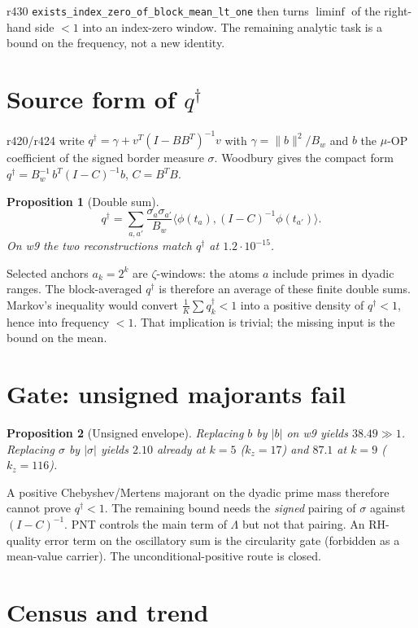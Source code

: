 \documentclass[11pt]{article}
\newtheorem{prop}{Proposition}
\theoremstyle{remark}
\newcommand{\qd}{q^{\dagger}}
\begin{document}
r430 \texttt{exists\_index\_zero\_of\_block\_mean\_lt\_one}
then turns $\liminf$ of the right-hand side $<1$ into an
index-zero window.  The remaining analytic task is a bound
on the frequency, not a new identity.

\section{Source form of $\qd$}\label{sec:src}

r420/r424 write
$\qd=\gamma+v^{T}(I-BB^{T})^{-1}v$ with
$\gamma=\lVert b\rVert^{2}/B_{w}$ and $b$ the $\mu$-OP
coefficient of the signed border measure $\sigma$.
Woodbury gives the compact form
$\qd=B_{w}^{-1}\,b^{T}(I-C)^{-1}b$, $C=B^{T}B$.

\begin{prop}[Double sum]\label{prop:src}
\[
\qd=\sum_{a,a'}\frac{\sigma_{a}\sigma_{a'}}{B_{w}}
\bigl\langle\phi(t_{a}),(I-C)^{-1}\phi(t_{a'})\bigr\rangle.
\]
On w9 the two reconstructions match $\qd$ at
$1.2\cdot 10^{-15}$.
\end{prop}

Selected anchors $a_{k}=2^{k}$ are $\zeta$-windows: the
atoms $a$ include primes in dyadic ranges.  The
block-averaged $\qd$ is therefore an average of these
finite double sums.  Markov's inequality would convert
$\frac1K\sum\qd_{k}<1$ into a positive density of
$\qd<1$, hence into frequency $<1$.  That implication is
trivial; the missing input is the bound on the mean.

\section{Gate: unsigned majorants fail}\label{sec:gate}

\begin{prop}[Unsigned envelope]\label{prop:unsigned}
Replacing $b$ by $|b|$ on w9 yields $38.49\gg 1$.
Replacing $\sigma$ by $|\sigma|$ yields $2.10$ already
at $k=5$ ($k_{z}=17$) and $87.1$ at $k=9$ ($k_{z}=116$).
\end{prop}

A positive Chebyshev/Mertens majorant on the dyadic
prime mass therefore cannot prove $\qd<1$.
The remaining bound needs the \emph{signed} pairing of
$\sigma$ against $(I-C)^{-1}$.
PNT controls the main term of $\Lambda$ but not that
pairing.  An RH-quality error term on the oscillatory
sum is the circularity gate (forbidden as a mean-value
carrier).  The unconditional-positive route is closed.

\section{Census and trend}\label{sec:census}
\end{document}
